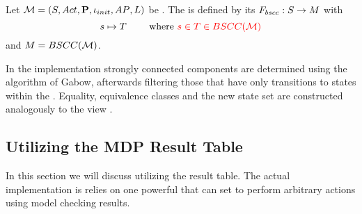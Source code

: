 \documentclass[preview]{standalone}
\begin{document}

\begin{definition}
	Let ${{{\mathcal{M}}}} = {{({S}, {Act}, {\textbf{P}}, {\iota_{init}}, {AP}, {L})}}$ be \chosengraphtypeN. The \viewN \viewbscc is defined by its \grpfctN ${{F_{bscc}}} : {S} \to {\ensuremath{{M}}}$ with
	\[
	\state \mapsto \scc \quad \quad \text{ where } \redcomment{\state \in \scc \in \setbscc}
	\]
	and ${{M}} = {BSCC({{{\mathcal{M}}}})}$.
\end{definition}

In the implementation strongly connected components are determined using the algorithm of Gabow, afterwards filtering those \sccsN that have only transitions to states within the \sccN. Equality, equivalence classes and the new state set are constructed analogously to the view \viewscc.

\subsection{Utilizing the MDP Result Table}
In this section we will discuss \viewsN utilizing the result table. The actual implementation is relies on one powerful \viewN that can set to perform arbitrary actions using model checking results.

\end{document}
